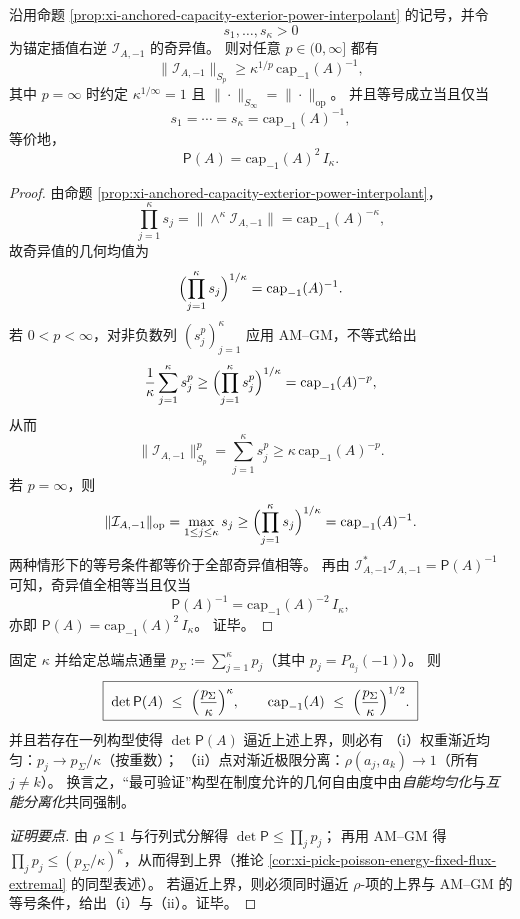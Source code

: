 \begin{theorem}\label{thm:xi-anchored-schatten-capacity-rigidity}
沿用命题 \ref{prop:xi-anchored-capacity-exterior-power-interpolant} 的记号，并令
\[
s_1,\dots,s_\kappa>0
\]
为锚定插值右逆 \(\mathcal{I}_{A,-1}\) 的奇异值。
则对任意 \(p\in(0,\infty]\) 都有
\[
\boxed{\;
\|\mathcal{I}_{A,-1}\|_{S_p}
\ge
\kappa^{1/p}\,\mathrm{cap}_{-1}(A)^{-1},\;}
\]
其中 \(p=\infty\) 时约定 \(\kappa^{1/\infty}=1\) 且 \(\|\cdot\|_{S_\infty}=\|\cdot\|_{\mathrm{op}}\)。
并且等号成立当且仅当
\[
s_1=\cdots=s_\kappa=\mathrm{cap}_{-1}(A)^{-1},
\]
等价地，
\[
\boxed{\;\mathsf P(A)=\mathrm{cap}_{-1}(A)^2\,I_\kappa.\;}
\]
\end{theorem}
\begin{proof}
由命题 \ref{prop:xi-anchored-capacity-exterior-power-interpolant}，
\[
\prod_{j=1}^{\kappa}s_j
=
\bigl\|\wedge^\kappa \mathcal I_{A,-1}\bigr\|
=
\mathrm{cap}_{-1}(A)^{-\kappa},
\]
故奇异值的几何均值为
\[
\Bigl(\prod_{j=1}^{\kappa}s_j\Bigr)^{1/\kappa}
=
\mathrm{cap}_{-1}(A)^{-1}.
\]
若 \(0<p<\infty\)，对非负数列 \((s_j^p)_{j=1}^{\kappa}\) 应用 AM--GM，不等式给出
\[
\frac1\kappa\sum_{j=1}^{\kappa}s_j^p
\ge
\Bigl(\prod_{j=1}^{\kappa}s_j^p\Bigr)^{1/\kappa}
=
\mathrm{cap}_{-1}(A)^{-p},
\]
从而
\[
\|\mathcal I_{A,-1}\|_{S_p}^p
=
\sum_{j=1}^{\kappa}s_j^p
\ge
\kappa\,\mathrm{cap}_{-1}(A)^{-p}.
\]
若 \(p=\infty\)，则
\[
\|\mathcal I_{A,-1}\|_{\mathrm{op}}
=
\max_{1\le j\le \kappa}s_j
\ge
\Bigl(\prod_{j=1}^{\kappa}s_j\Bigr)^{1/\kappa}
=
\mathrm{cap}_{-1}(A)^{-1}.
\]
两种情形下的等号条件都等价于全部奇异值相等。
再由
\(
\mathcal I_{A,-1}^\ast\mathcal I_{A,-1}=\mathsf P(A)^{-1}
\)
可知，奇异值全相等当且仅当
\[
\mathsf P(A)^{-1}=\mathrm{cap}_{-1}(A)^{-2}\,I_\kappa,
\]
亦即
\(
\mathsf P(A)=\mathrm{cap}_{-1}(A)^2\,I_\kappa
\)。
证毕。
\end{proof}

\begin{corollary}\label{cor:xi-anchored-capacity-extremal-fixed-flux}
固定 \(\kappa\) 并给定总端点通量 \(p_{\Sigma}:=\sum_{j=1}^{\kappa}p_j\)（其中 \(p_j=P_{a_j}(-1)\)）。
则
\[
\boxed{\;
\det\mathsf P(A)\ \le\ \Bigl(\frac{p_{\Sigma}}{\kappa}\Bigr)^{\kappa},\qquad
\mathrm{cap}_{-1}(A)\ \le\ \Bigl(\frac{p_{\Sigma}}{\kappa}\Bigr)^{1/2}.\;}
\]
并且若存在一列构型使得 \(\det\mathsf P(A)\) 逼近上述上界，则必有
（i）权重渐近均匀：\(p_j\to p_{\Sigma}/\kappa\)（按重数）；
（ii）点对渐近极限分离：\(\rho(a_j,a_k)\to 1\)（所有 \(j\neq k\)）。
换言之，“最可验证”构型在制度允许的几何自由度中由\emph{自能均匀化}与\emph{互能分离化}共同强制。
\end{corollary}
\begin{proof}[证明要点]
由 \(\rho\le 1\) 与行列式分解得 \(\det\mathsf P\le\prod_j p_j\)；
再用 AM--GM 得 \(\prod_j p_j\le (p_{\Sigma}/\kappa)^{\kappa}\)，从而得到上界（推论 \ref{cor:xi-pick-poisson-energy-fixed-flux-extremal} 的同型表述）。
若逼近上界，则必须同时逼近 \(\rho\)-项的上界与 AM--GM 的等号条件，给出（i）与（ii）。证毕。
\end{proof}

